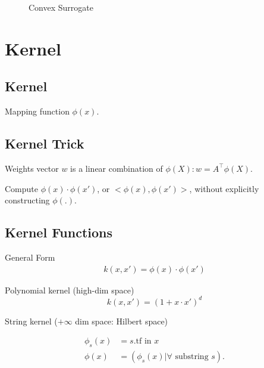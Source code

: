 \documentclass[a4paper]{report}
\begin{document}
\begin{figure}[!htp]
\centering
{}
\caption{Convex Surrogate}
\label{fig:convexSurrogates}
\end{figure}


\chapter{Kernel}
\section{Kernel}
Mapping function $\phi(x)$. 
\section{Kernel Trick}
Weights vector $w$ is a linear combination of $\phi(X): w=A^\top\phi(X)$.

Compute $\phi(x)\cdot \phi(x')$, or $<\phi(x), \phi(x')>$, without explicitly constructing $\phi(.)$. 

\section{Kernel Functions}
General Form 
\begin{align*}
k(x, x') = \phi(x)\cdot\phi(x')
\end{align*}

Polynomial kernel (high-dim space)
$$
k(x, x')=(1+x\cdot x')^d
$$

String kernel ($+\infty$ dim space: Hilbert space)

\begin{align*}
\phi_s(x)&= s.\text{tf in } x\\
\phi(x) &= (\phi_s(x)|\forall \text{ substring } s). \\
\end{align*}
\end{document}
